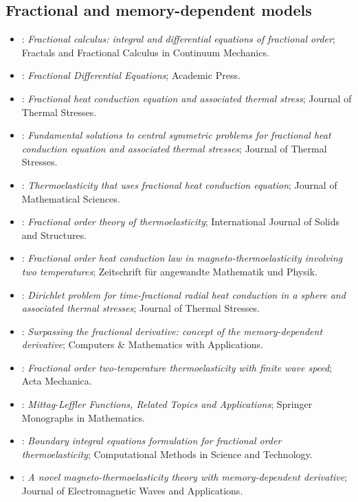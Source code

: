 \subsection{Fractional and memory-dependent models}
\begin{itemize}\itemsep0pt\small
\item \citet{Gorenflo1997}: \emph{Fractional calculus: integral and differential equations of fractional order}; Fractals and Fractional Calculus in Continuum Mechanics.
\item \citet{Podlubny1999}: \emph{Fractional Differential Equations}; Academic Press.
\item \citet{Povstenko2004}: \emph{Fractional heat conduction equation and associated thermal stress}; Journal of Thermal Stresses.
\item \citet{Povstenko2007}: \emph{Fundamental solutions to central symmetric problems for fractional heat conduction equation and associated thermal stresses}; Journal of Thermal Stresses.
\item \citet{Povstenko2009}: \emph{Thermoelasticity that uses fractional heat conduction equation}; Journal of Mathematical Sciences.
\item \citet{Sherief2010Fractional}: \emph{Fractional order theory of thermoelasticity}; International Journal of Solids and Structures.
\item \citet{Ezzat2011}: \emph{Fractional order heat conduction law in magneto-thermoelasticity involving two temperatures}; Zeitschrift für angewandte Mathematik und Physik.
\item \citet{Povstenko2011}: \emph{Dirichlet problem for time-fractional radial heat conduction in a sphere and associated thermal stresses}; Journal of Thermal Stresses.
\item \citet{Wang2011}: \emph{Surpassing the fractional derivative: concept of the memory-dependent derivative}; Computers \& Mathematics with Applications.
\item \citet{Sur2012}: \emph{Fractional order two-temperature thermoelasticity with finite wave speed}; Acta Mechanica.
\item \citet{GorenfloKilbasMainardiRogosin2014}: \emph{Mittag-Leffler Functions, Related Topics and Applications}; Springer Monographs in Mathematics.
\item \citet{Tiwari2014}: \emph{Boundary integral equations formulation for fractional order thermoelasticity}; Computational Methods in Science and Technology.
\item \citet{Ezzat2015}: \emph{A novel magneto-thermoelasticity theory with memory-dependent derivative}; Journal of Electromagnetic Waves and Applications.

\end{itemize}
